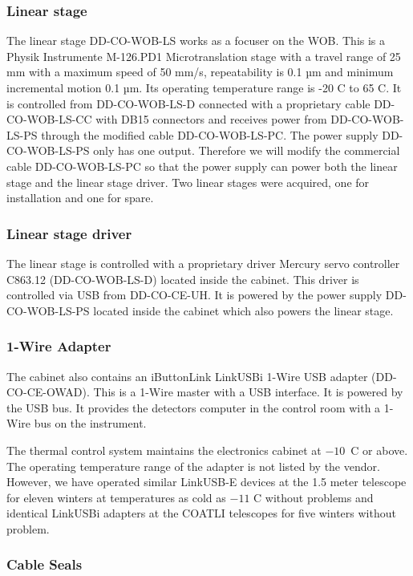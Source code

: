\documentclass{article}
\begin{document}
\subsubsection{Linear stage}
The linear stage DD-CO-WOB-LS works as a focuser on the WOB. This is a Physik Instrumente M-126.PD1 Microtranslation stage with a travel range of 25 mm  with a maximum speed of 50 mm/s, repeatability is 0.1 µm and minimum incremental motion 0.1 µm. Its operating temperature range is -20 C to 65 C. It is controlled from DD-CO-WOB-LS-D connected with a proprietary cable DD-CO-WOB-LS-CC with DB15 connectors and receives power from DD-CO-WOB-LS-PS through the modified cable DD-CO-WOB-LS-PC. The power supply DD-CO-WOB-LS-PS only has one output. Therefore we will modify the commercial cable DD-CO-WOB-LS-PC so that the power supply can power both the linear stage and the linear stage driver.
Two linear stages were acquired, one for installation and one for spare. 

\subsubsection{Linear stage driver}
The linear stage is controlled with a proprietary driver Mercury servo controller C863.12 (DD-CO-WOB-LS-D) located inside the cabinet. This driver is controlled via USB from DD-CO-CE-UH. It is powered by the power supply DD-CO-WOB-LS-PS located inside the cabinet which also powers the linear stage.


\subsubsection{1-Wire Adapter}

The cabinet also contains an iButtonLink LinkUSBi 1-Wire USB adapter (DD-CO-CE-OWAD). This is a 1-Wire master with a USB interface. It is powered by the USB bus. It provides the detectors computer in the control room with a 1-Wire bus on the instrument.

The thermal control system maintains the electronics cabinet at $-10$~C or above. The operating temperature range of the adapter is not listed by the vendor. However, we have operated similar LinkUSB-E devices at the 1.5 meter telescope for eleven winters at temperatures as cold as $-11$ C without problems and identical LinkUSBi adapters at the COATLI telescopes for five winters without problem. 

\subsubsection{Cable Seals}
\end{document}
